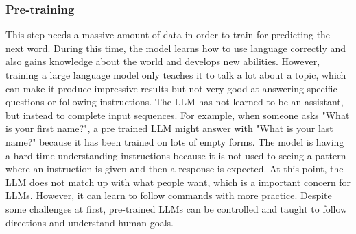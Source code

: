 \subsubsection{Pre-training}
This step needs a massive amount of data in order to train for predicting the next word. During this time, the model learns how to use language correctly and also gains knowledge about the world and develops new abilities.
\vskip 0.5cm
However, training a large language model only teaches it to talk a lot about a topic, which can make it produce impressive results but not very good at answering specific questions or following instructions. The LLM has not learned to be an assistant, but instead to complete input sequences. For example, when someone asks "What is your first name?", a pre trained LLM might answer with "What is your last name?" because it has been trained on lots of empty forms. The model is having a hard time understanding instructions because it is not used to seeing a pattern where an instruction is given and then a response is expected. At this point, the LLM does not match up with what people want, which is a important concern for LLMs. However, it can learn to follow commands with more practice. Despite some challenges at first, pre-trained LLMs can be controlled and taught to follow directions and understand human goals.
